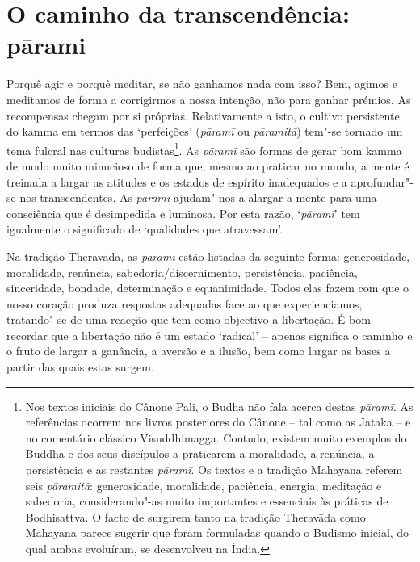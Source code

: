 \section{O caminho da transcendência: pārami}

Porquê agir e porquê meditar, se não ganhamos nada com isso? Bem, agimos e meditamos de forma a corrigirmos a nossa intenção, não para ganhar prémios. As recompensas chegam por si próprias. Relativamente a isto, o cultivo persistente do kamma em termos das `perfeições' (\emph{pāramī} ou \emph{pāramitā}) tem"-se tornado um tema fulcral nas culturas budistas\footnote{Nos textos iniciais do Cânone Pali, o Budha não fala acerca destas \emph{pāramī}. As referências ocorrem nos livros posteriores do Cânone -- tal como as Jataka -- e no comentário clássico Visuddhimagga. Contudo, existem muito exemplos do Buddha e dos seus discípulos a praticarem a moralidade, a renúncia, a persistência e as restantes \emph{pāramī}. Os textos e a tradição Mahayana referem seis \emph{pāramitā}: generosidade, moralidade, paciência, energia, meditação e sabedoria, considerando"-as muito importantes e essenciais às práticas de Bodhisattva. O facto de surgirem tanto na tradição Theravāda como Mahayana parece sugerir que foram formuladas quando o Budismo inicial, do qual ambas evoluíram, se desenvolveu na Índia.}. As \emph{pāramī} são formas de gerar bom kamma de modo muito minucioso de forma que, mesmo ao praticar no mundo, a mente é treinada a largar as atitudes e os estados de espírito inadequados e a aprofundar"-se nos transcendentes. As \emph{pāramī} ajudam"-nos a alargar a mente para uma consciência que é desimpedida e luminosa. Por esta razão, `\emph{pāramī}' tem igualmente o significado de `qualidades que atravessam'.

Na tradição Theravāda, as \emph{pāramī} estão listadas da seguinte forma: generosidade, moralidade, renúncia, sabedoria/discernimento, persistência, paciência, sinceridade, bondade, determinação e equanimidade. Todos elas fazem com que o nosso coração produza respostas adequadas face ao que experienciamos, tratando"-se de uma reacção que tem como objectivo a libertação. É bom recordar que a libertação não é um estado `radical' -- apenas significa o caminho e o fruto de largar a ganância, a aversão e a ilusão, bem como largar as bases a partir das quais estas surgem.

